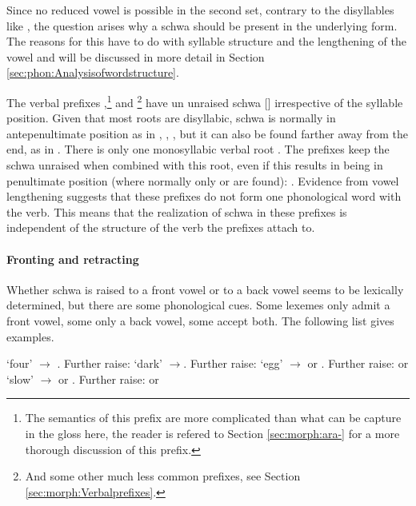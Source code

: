 Since no reduced vowel is possible in the second set, contrary to the disyllables like ,  the question arises why a schwa should be present in the underlying form. The reasons for this have to do with syllable structure and the lengthening of the vowel and will be discussed in more detail in Section \ref{sec:phon:Analysisofwordstructure}.


The verbal prefixes ,\footnote{The semantics of this prefix are more complicated than what can be capture in the gloss here, the reader is refered to Section \ref{sec:morph:ara-} for a more thorough discussion of this prefix.}
 and \footnote{And some other much less common prefixes, see Section \ref{sec:morph:Verbalprefixes}.} have un unraised schwa [\E] irrespective of the syllable position. Given that most roots are disyllabic,  schwa is normally in antepenultimate position as in , , , but it can also be found farther away from the end, as in .  There is only one monosyllabic verbal root . The prefixes keep the schwa unraised when combined with this root, even if this results in \phonet{\E} being in penultimate position (where normally only  or  are found): . Evidence from vowel lengthening suggests that these prefixes do not form one phonological word with the verb. This means that the realization of schwa in these prefixes is independent of the structure of the verb the prefixes attach to.



\paragraph{Fronting and retracting}\label{sec:phon:allophonesofschwa:frontingandretracting}

Whether schwa is raised to a front vowel  or to a back vowel   seems to be lexically determined, but there are some phonological cues. Some lexemes only admit a front vowel, some only a back vowel, some accept both. The following list gives examples.

\ea {} `four' $\to$ . Further raise:  \z
\ea {} `dark' $\to$. Further raise:  \z
\ea \phonem{\dentt@lor} `egg' $\to$ or . Further raise:   or \z
\ea {} `slow' $\to$ or . Further raise:   or \z

